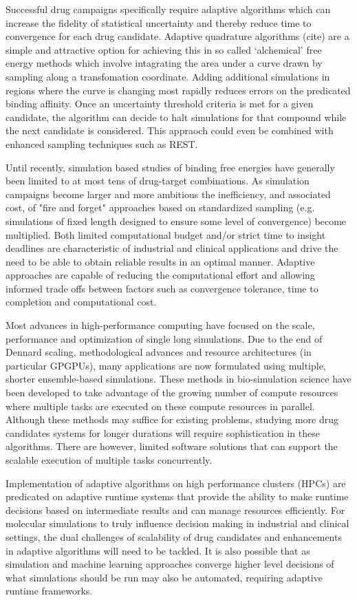 Successful drug campaigns specifically require 
adaptive algorithms which can increase the fidelity of statistical uncertainty
and thereby reduce time to convergence for each drug candidate. 
Adaptive quadrature algorithms (cite) are a simple and attractive option for 
achieving this in so called `alchemical' free energy methods which involve intagrating 
the area under a curve drawn by sampling along a transfomation coordinate.
Adding additional simulations in regions where the curve is changing most rapidly
reduces errors on the predicated binding affinity. 
Once an uncertainty threshold criteria is met for a given candidate, the algorithm can 
decide to halt simulations for that compound while the next candidate is considered. 
This appraoch could even be combined with enhanced sampling techniques such as 
REST.

Until recently, simulation based studies of binding free energies have generally 
been limited to at most tens of drug-target combinations. 
As simulation campaigns become larger and more ambitious the inefficiency, and 
associated cost, of "fire and forget" approaches based on standardized sampling 
(e.g. simulations of fixed length designed to ensure some level of convergence) 
become multiplied.
Both limited computational budget and/or strict time to insight deadlines are 
characteristic of industrial and clinical applications and drive the need to be 
able to obtain reliable results in an optimal manner.
Adaptive approaches are capable of reducing the computational effort and 
allowing informed trade offs between factors such as convergence tolerance, 
time to completion and computational cost.

Most advances in high-performance computing have focused on the scale,
performance and optimization of single long simulations. Due to the end of
Dennard scaling, methodological advances and resource architectures (in 
particular GPGPUs), many applications are now formulated using multiple, shorter 
ensemble-based simulations.  
These methods in bio-simulation science have been developed to take advantage of 
the growing number of compute resources where multiple tasks are executed on 
these compute resources in parallel. Although these methods may suffice for 
existing problems, studying more drug candidates systems for longer durations 
will require sophistication in these algorithms. 
There are however, limited software solutions that can support the 
scalable execution of multiple tasks concurrently.

Implementation of adaptive algorithms on high performance clusters (HPCs) are 
predicated on adaptive runtime systems that provide the ability to make runtime 
decisions based on intermediate results and can manage resources efficiently. 
For molecular simulations to truly influence decision making in industrial and 
clinical settings, the dual challenges of scalability of drug candidates and 
enhancements in adaptive algorithms will need to be tackled. 
It is also possible that as simulation and machine learning approaches converge 
higher level decisions of what simulations should be run may also be automated, 
requiring adaptive runtime frameworks.

